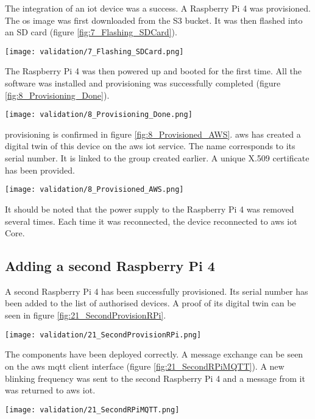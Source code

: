 The integration of an \acrshort{iot} device was a success. A Raspberry Pi 4 was provisioned. The \acrshort{os} image was first downloaded from the S3 bucket. It was then flashed into an SD card (figure \ref{fig:7_Flashing_SDCard}).
\begin{center}
    \begingroup
    \texttt{[image: validation/7\_Flashing\_SDCard.png]}
    \label{fig:7_Flashing_SDCard}
    \endgroup
\end{center}
The Raspberry Pi 4 was then powered up and booted for the first time. All the software was installed and \gls{provisioning} was successfully completed (figure \ref{fig:8_Provisioning_Done}).
\begin{center}
    \begingroup
    \texttt{[image: validation/8\_Provisioning\_Done.png]}
    \label{fig:8_Provisioning_Done}
    \endgroup
\end{center}
\Gls{provisioning} is confirmed in figure \ref{fig:8_Provisioned_AWS}. \gls{aws} has created a digital twin of this device on the \gls{aws} \acrshort{iot} service. The name corresponds to its serial number. It is linked to the group created earlier. A unique X.509 certificate has been provided.
\begin{center}
    \begingroup
    \texttt{[image: validation/8\_Provisioned\_AWS.png]}
    \label{fig:8_Provisioned_AWS}
    \endgroup
\end{center}
It should be noted that the power supply to the Raspberry Pi 4 was removed several times. Each time it was reconnected, the device reconnected to \gls{aws} \acrshort{iot} Core.

\subsection{Adding a second Raspberry Pi 4}
A second Raspberry Pi 4 has been successfully provisioned. Its serial number has been added to the list of authorised devices. A proof of its digital twin can be seen in figure \ref{fig:21_SecondProvisionRPi}.
\begin{center}
    \begingroup
    \texttt{[image: validation/21\_SecondProvisionRPi.png]}
    \label{fig:21_SecondProvisionRPi}
    \endgroup
\end{center}
The components have been deployed correctly. A message exchange can be seen on the \gls{aws} \acrshort{mqtt} client interface (figure \ref{fig:21_SecondRPiMQTT}). A new blinking frequency was sent to the second Raspberry Pi 4 and a message from it was returned to \gls{aws} \acrshort{iot}.
\begin{center}
    \begingroup
    \texttt{[image: validation/21\_SecondRPiMQTT.png]}
    \label{fig:21_SecondRPiMQTT}
    \endgroup
\end{center}

